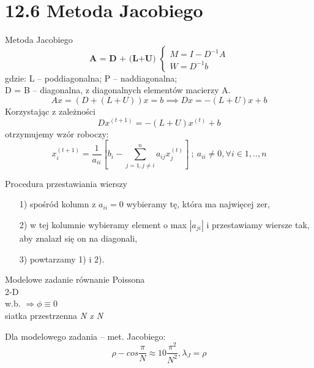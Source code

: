 \section{12.6 Metoda Jacobiego}

\begin{frame}{Metoda Jacobiego}
  $$
  \textbf{A = D + (L+U)   }
  \begin{cases}
  M=I-D^{-1}A\\
  W=D^{-1}b
  \end{cases}
  $$
  gdzie: L -- poddiagonalna; P -- naddiagonalna;\\
  D = B -- diagonalna, z diagonalnych elementów macierzy A.
  $$Ax = (D+(L+U))x = b \implies Dx = -(L+U)x + b$$
  Korzystając z zależności
  $$\boxed{Dx^{(t+1)}= -(L+U)x^{(t)}+b}$$
  otrzymujemy wzór roboczy:
  $$x_i^{(t+1)}=\frac{1}{a_{ii}}[b_i-\sum_{j=1,j\neq i}^{n} a_{ij}x_j^{(t)}]\  ;\  a_{ii} \neq 0, \forall i \in {1,..,n} $$
\end{frame}

\begin{frame}
  \begin{block}{Procedura przestawiania wierszy}
    \begin{itemize}
      \item[1)] spośród kolumn z $a_{ii} = 0$ wybieramy tę, która ma najwięcej zer,
      \item[2)] w tej kolumnie wybieramy element o max $|a_{ji}|$ i przestawiamy wiersze tak, aby znalazł się on na diagonali,
      \item[3)] powtarzamy 1) i 2).
    \end{itemize}
  \end{block}
\end{frame}

\begin{frame}{}
  \begin{block}{Modelowe zadanie}
    równanie Poissona
    \\2-D
    \\w.b. $\Rightarrow\phi\equiv 0$
    \\siatka przestrzenna \emph{N x N}
  \end{block}

  \begin{block}{Dla modelowego zadania -- met. Jacobiego:}  %
    $$\rho - cos\frac{\pi}{N}\approx 1 0 \frac{\pi^2}{N^2}, \lambda _J = \rho$$
  \end{block}
\end{frame}

